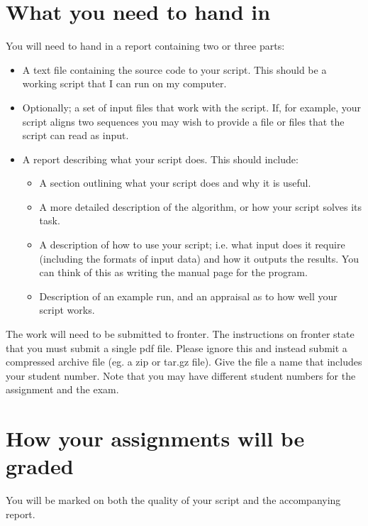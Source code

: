 \documentclass[11pt]{article}
\begin{document}
\section{What you need to hand in}
You will need to hand in a report containing two or three parts:
\begin{itemize}
\item A text file containing the source code to your script. This should be a
  working script that I can  run on my computer.
\item Optionally; a set of input files that work with the script. If, for
  example, your script aligns two sequences you may wish to provide a file or
  files that the script can read as input.
\item A report describing what your script does. This should include:
  \begin{itemize}
  \item A section outlining what your script does and why it is useful.
  \item A more detailed description of the algorithm, or how your script
    solves its task.
  \item A description of how to use your script; i.e. what input does it
    require (including the formats of input data) and how it outputs the results. You
    can think of this as writing the manual page for the program.
  \item Description of an example run, and an appraisal as to how well your
    script works.
  \end{itemize}
\end{itemize}

The work will need to be submitted to fronter. The instructions on fronter
state that you must submit a single pdf file. Please ignore this and instead
submit a compressed archive file (eg. a zip or tar.gz file). Give the file a
name that includes your student number. Note that you may have different
student numbers for the assignment and the exam.

\section{How your assignments will be graded}
You will be marked on both the quality of your script and the accompanying
report.
\end{document}
